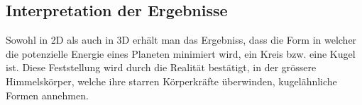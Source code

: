 \subsection{Interpretation der Ergebnisse}
Sowohl in 2D als auch in 3D erhält man das Ergebniss, dass die Form in welcher die potenzielle Energie eines Planeten minimiert wird, ein Kreis bzw. eine Kugel ist.
Diese Feststellung wird durch die Realität bestätigt, in der grössere Himmelskörper, welche ihre starren Körperkräfte überwinden, kugelähnliche Formen annehmen.

